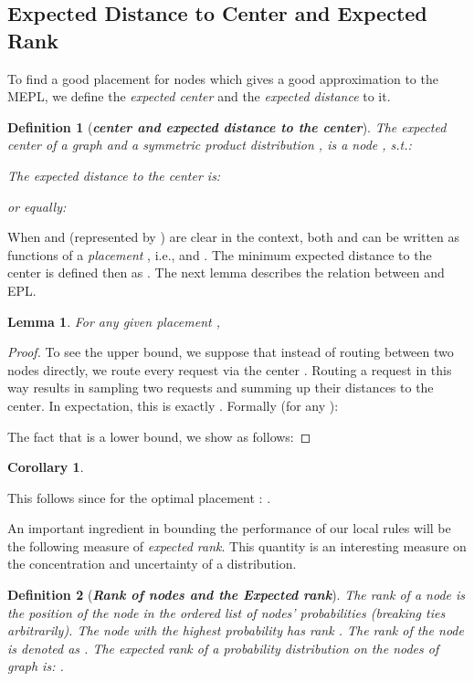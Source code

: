 \documentclass[conference]{IEEEtran}
\newtheorem{lemma}{Lemma}
\newtheorem{corollary}{Corollary}
\newtheorem{definition}{Definition}
\begin{document}
\subsection{Expected Distance to Center and Expected Rank} 
To find a good placement  for nodes which gives a good approximation to the MEPL, we define the \emph{expected center} and the \emph{expected distance} to it.
\begin{definition}[\bf \emph{center and expected distance to the center}]
The expected center of a graph  and a symmetric product distribution , is a node , s.t.:

The expected distance to the center  is:

or equally:

\end{definition}
When  and  (represented by ) are clear in the context, both  and  can be written as functions of a \emph{placement } , i.e.,  and . The minimum expected distance to the center is defined then as .
The next lemma describes the relation between  and EPL.
 \begin{lemma}\label{lem:epl-c}
For any given placement  ,

\end{lemma}
\begin{proof}
To see the upper bound, we suppose that instead of routing between two nodes directly, we route every request via the center . Routing a request in this way results in sampling two requests and summing up their distances to the center. In expectation, this is exactly . Formally (for any ):

The fact that  is a lower bound, we show as follows:

\end{proof}

\begin{corollary}

\end{corollary}
This follows since for the optimal placement : .

\noindent An important ingredient in bounding the performance of our local rules  will be the following measure of \emph{expected rank}.
This quantity is an interesting measure on the concentration and uncertainty of a distribution.
\begin{definition}[\bf \emph{Rank of nodes and the Expected rank}]\label{dfn:rank}
The rank of a node is the position of the node in the ordered list of nodes' probabilities (breaking ties arbitrarily). The node with the highest probability has rank . The rank of the node  is denoted as .
The expected rank of a probability distribution on the nodes of graph  is:
.
\end{definition}
\end{document}
